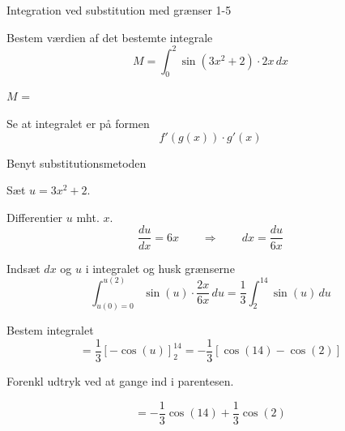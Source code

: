 \documentclass{article}
\begin{document}
\begin{exercise}{Integration ved substitution med grænser 1-5}
	
	
	Bestem værdien af det bestemte integrale
	\[
	M = \int_0^2 \sin(3x^2+2) \cdot 2x \, dx
	\]
	
	$M$ =  
	
	
	
	\hint
	
	Se at integralet er på formen
	\[
	f'(g(x)) \cdot g'(x)
	\]
	
	\hint
	
	Benyt substitutionsmetoden
	
	\hint
	
	Sæt $u=3x^2+2$.
	
	
	\hint
	
	Differentier $u$ mht. $x$.
	\[
	\frac{du}{dx} = 6x \qquad	\Rightarrow \qquad dx = \frac{du}{6x}
	\]
	
	\hint
	
	Indsæt $dx$ og $u$ i integralet og husk grænserne
	\[
	\int_{u(0)=0}^{u(2)} \sin(u) \cdot \frac{2x}{6x} \, du = \frac{1}{3} \int_2^{14} \sin(u) \, du
	\]
	
	\hint
	
	Bestem integralet
	\[
	= \frac{1}{3} \left[ -\cos(u) \right]_2^{14} = - \frac{1}{3} \left[ \cos(14) - \cos(2) \right]
	\]
	
	\hint
	Forenkl udtryk ved at gange ind i parentesen.
	
	\hint
	
	\[
	= - \frac{1}{3} \cos(14) + \frac{1}{3} \cos(2)
	\]
	
	
\end{exercise}

\newpage
\end{document}
